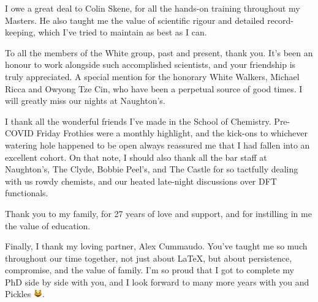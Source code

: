 {I owe a great deal to Colin Skene, for all the hands-on training throughout my Masters.
He also taught me the value of scientific rigour and detailed record-keeping, which I've tried to maintain as best as I can.

To all the members of the White group, past and present, thank you.
It's been an honour to work alongside such accomplished scientists, and your friendship is truly appreciated.
A special mention for the honorary White Walkers, Michael Ricca and Owyong Tze Cin, who have been a perpetual source of good times.
I will greatly miss our nights at Naughton's.

I thank all the wonderful friends I've made in the School of Chemistry.
Pre-COVID Friday Frothies were a monthly highlight, and the kick-ons to whichever watering hole happened to be open always reassured me that I had fallen into an excellent cohort.
On that note, I should also thank all the bar staff at Naughton's, The Clyde, Bobbie Peel's, and The Castle for so tactfully dealing with us rowdy chemists, and our heated late-night discussions over DFT functionals.

Thank you to my family, for 27 years of love and support, and for instilling in me the value of education.

Finally, I thank my loving partner, Alex Cummaudo.
You've taught me so much throughout our time together, not just about \LaTeX{}, but about persistence, compromise, and the value of family.
I'm so proud that I got to complete my PhD side by side with you, and I look forward to many more years with you and Pickles \includegraphics[width=1em]{Figures/pickles.png}.
}
